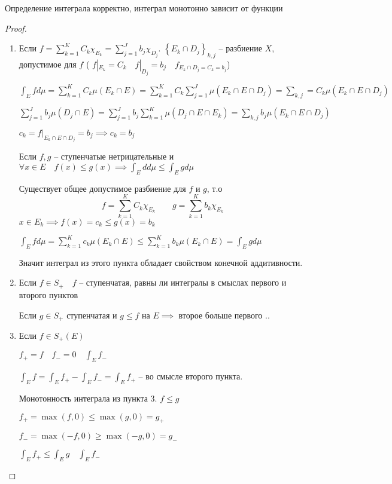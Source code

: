 \documentclass{book}
\theoremstyle{definition}
\begin{document}
\begin{statement}
    Определение интеграла корректно, интеграл монотонно зависит от функции
\end{statement}
\begin{proof}
    \begin{enumerate}
        \item Если $f = \sum_{k=1}^{K} C_k\chi_{E_k} = \sum_{j=1}^{J} b_j\chi_{D_j}$. $\left\{ E_k\cap D_j \right\}_{k,j} $ -- разбиение $X$, допустимое для  $f$ ( $f|_{E_k} = C_k\quad f|_{D_j} = b_j\quad f_{E_k\cap D_j = C_k = b_j}$)

            $\int_Efd\mu = \sum_{k=1}^{K} C_k\mu\left( E_k\cap E \right)  = \sum_{k=1}^{K} C_k \sum_{j=1}^{J} \mu\left( E_k\cap E\cap D_j \right)  = \sum_{k,j} = C_k\mu\left( E_k\cap E\cap D_j \right) $

            $\sum_{j=1}^{J} b_j\mu\left( D_j\cap E \right)  = \sum_{j=1}^{J} b_j \sum_{k=1}^{K} \mu\left( D_j\cap E\cap E_k \right)  = \sum_{k,j}b_j \mu\left( E_k\cap E\cap D_j \right) $ 

            $c_k = f|_{E_k\cap E\cap D_j} = b_j \implies c_k = b_j$

            Если $f, g$ -- ступенчатые нетрицательные и  $\forall x\in E\quad f(x)\leqslant g(x) \implies \int_Edd\mu \leqslant \int_Egd\mu$

            Существует общее допустимое разбиение для $f$ и $g$, т.о \[f = \sum_{k=1}^{K} C_k\chi_{E_k}\qquad g = \sum_{k=1}^{K} b_k\chi_{E_k}\] 
            $x\in E_k \implies f(x) = c_k \leqslant  g(x) = b_k$

            $\int_E fd\mu = \sum_{k=1}^{K} c_k\mu\left( E_k\cap E \right) \leqslant \sum_{k=1}^{K} b_k\mu\left( E_k\cap E \right)  = \int_Egd\mu$ 

            Значит интеграл из этого пункта обладает свойством конечной аддитивности. 
        \item Если $f\in S_+\quad f$ -- ступенчатая, равны ли интегралы в смыслах первого и второго пунктов

            Если  $g\in S_+$ ступенчатая и $g\leqslant f$ на $E \implies $ второе больше первого ..
        \item Если $f\in S_+(E)$

             $f_+ = f\quad f_- = 0\quad \int_E f_- $

              $\int_E f = \int_E f_+ - \int_E f_- = \int_Ef_+$ -- во смысле второго пункта. 

         Монотонность интеграла из пункта 3.  $f\leqslant g$

         $f_+ = \max\left( f, 0 \right) \leqslant \max\left( g, 0 \right)  = g_+$

         $f_- = \max\left( -f, 0 \right) \geqslant \max\left( -g, 0 \right)  = g_-$

         $\int_Ef_+ \leqslant \int_Eg\quad \int_Ef_-$
    \end{enumerate}
\end{proof}
\end{document}
